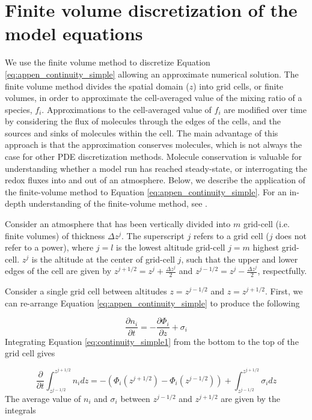 \section{Finite volume discretization of the model equations} \label{sec:finite_volume}

We use the finite volume method to discretize Equation \eqref{eq:appen_continuity_simple} allowing an approximate numerical solution. The finite volume method divides the spatial domain ($z$) into grid cells, or finite volumes, in order to approximate the cell-averaged value of the mixing ratio of a species, $f_i$. Approximations to the cell-averaged value of $f_i$ are modified over time by considering the flux of molecules through the edges of the cells, and the sources and sinks of molecules within the cell. The main advantage of this approach is that the approximation conserves molecules, which is not always the case for other PDE discretization methods. Molecule conservation is valuable for understanding whether a model run has reached steady-state, or interrogating the redox fluxes into and out of an atmosphere. Below, we describe the application of the finite-volume method to Equation \eqref{eq:appen_continuity_simple}. For an in-depth understanding of the finite-volume method, see \citet{Leveque_2002}.

Consider an atmosphere that has been vertically divided into $m$ grid-cell (i.e. finite volumes) of thickness $\Delta z^j$. The superscript $j$ refers to a grid cell ($j$ does not refer to a power), where $j = l$ is the lowest altitude grid-cell $j = m$ highest grid-cell. $z^j$ is the altitude at the center of grid-cell $j$, such that the upper and lower edges of the cell are given by $z^{j+1/2} = z^j + \frac{\Delta z^j}{2}$ and $z^{j-1/2} = z^j - \frac{\Delta z^j}{2}$, respectfully.

Consider a single grid cell between altitudes $z = z^{j-1/2}$ and $z = z^{j+1/2}$. First, we can re-arrange Equation \eqref{eq:appen_continuity_simple} to produce the following

\begin{equation} \label{eq:continuity_simple1}
  \frac{\partial n_i}{\partial t} = - \frac{\partial \Phi_{i}}{\partial z} + \sigma_i
\end{equation}
Integrating Equation \eqref{eq:continuity_simple1} from the bottom to the top of the grid cell gives

\begin{equation} \label{eq:continuity_simple_conservative}
  \frac{\partial}{\partial t} \int_{z^{j-1/2}}^{z^{j+1/2}} n_i dz = - (\Phi_{i}(z^{j+1/2}) - \Phi_{i}(z^{j-1/2})) + \int_{z^{j-1/2}}^{z^{j+1/2}} \sigma_i dz
\end{equation}
The average value of $n_i$ and $\sigma_i$ between $z^{j-1/2}$ and $z^{j+1/2}$ are given by the integrals


